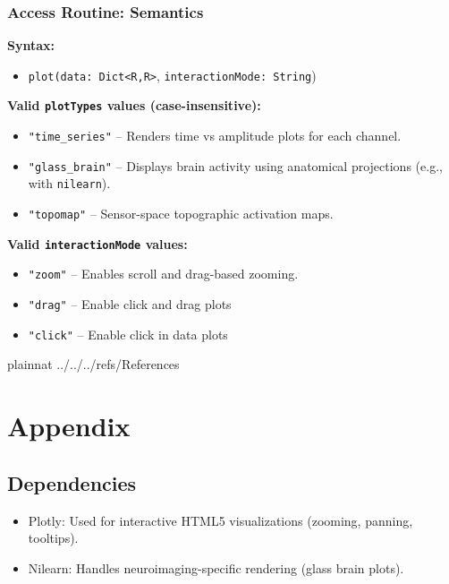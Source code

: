 \documentclass[12pt, titlepage]{article}
\begin{document}
\subsubsection{Access Routine: Semantics}

\noindent\textbf{Syntax:}
\begin{itemize}
  \item \texttt{plot(data: Dict<R,R>},  \texttt{interactionMode: String})
\end{itemize}

\noindent\textbf{Valid \texttt{plotTypes} values (case-insensitive):}
\begin{itemize}
  \item \texttt{"time\_series"} – Renders time vs amplitude plots for each channel.
  \item \texttt{"glass\_brain"} – Displays brain activity using anatomical projections (e.g., with \texttt{nilearn}).
  \item \texttt{"topomap"} – Sensor-space topographic activation maps.
\end{itemize}

\noindent\textbf{Valid \texttt{interactionMode} values:}
\begin{itemize}
  \item \texttt{"zoom"} – Enables scroll and drag-based zooming.
  \item \texttt{"drag"} – Enable click and drag plots
  \item \texttt{"click"} – Enable click in data plots
\end{itemize}
\newpage

 {plainnat}
 {../../../refs/References}

\newpage

\section{Appendix} \label{Appendix}

\subsection{ Dependencies}
\begin{itemize}
\item Plotly: Used for interactive HTML5 visualizations (zooming, panning, tooltips).


\item Nilearn: Handles neuroimaging-specific rendering (glass brain plots).


\end{itemize}
\end{document}
